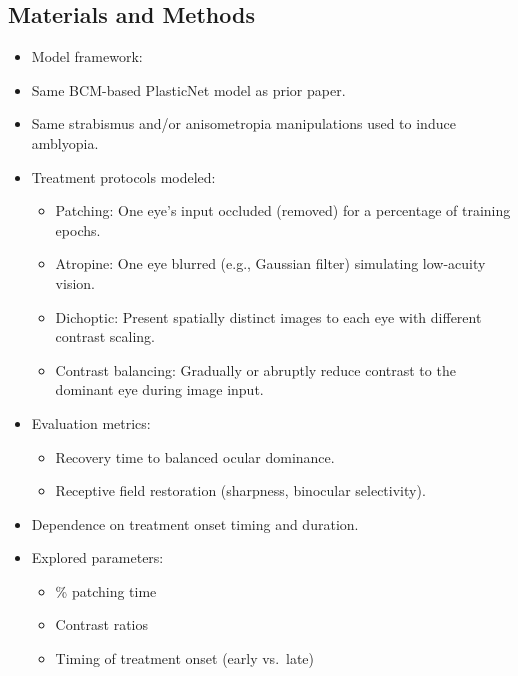 \documentclass[
]{article}
\providecommand{\tightlist}{%
  \setlength{\itemsep}{0pt}\setlength{\parskip}{0pt}}
\begin{document}
\subsection{Materials and Methods}\label{sec:materials-and-methods}

\begin{itemize}
\tightlist
\item[$\square$]
  Model framework:
\item[$\square$]
  Same BCM-based PlasticNet model as prior paper.
\item[$\square$]
  Same strabismus and/or anisometropia manipulations used to induce
  amblyopia.
\item[$\square$]
  Treatment protocols modeled:

  \begin{itemize}
  \tightlist
  \item[$\square$]
    Patching: One eye's input occluded (removed) for a percentage of
    training epochs.
  \item[$\square$]
    Atropine: One eye blurred (e.g., Gaussian filter) simulating
    low-acuity vision.
  \item[$\square$]
    Dichoptic: Present spatially distinct images to each eye with
    different contrast scaling.
  \item[$\square$]
    Contrast balancing: Gradually or abruptly reduce contrast to the
    dominant eye during image input.
  \end{itemize}
\item[$\square$]
  Evaluation metrics:

  \begin{itemize}
  \tightlist
  \item[$\square$]
    Recovery time to balanced ocular dominance.
  \item[$\square$]
    Receptive field restoration (sharpness, binocular selectivity).
  \end{itemize}
\item[$\square$]
  Dependence on treatment onset timing and duration.
\item[$\square$]
  Explored parameters:

  \begin{itemize}
  \tightlist
  \item[$\square$]
    \% patching time
  \item[$\square$]
    Contrast ratios
  \item[$\square$]
    Timing of treatment onset (early vs.~late)
  \end{itemize}
\end{itemize}
\end{document}
